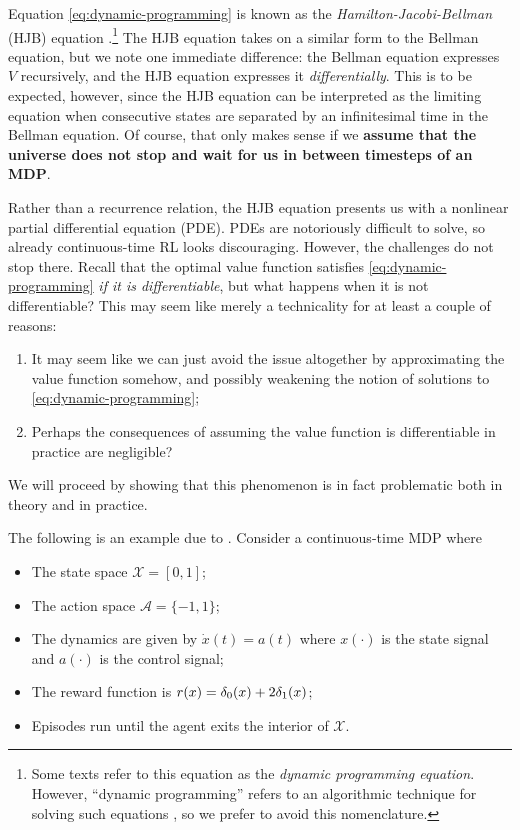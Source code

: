 Equation \eqref{eq:dynamic-programming} is known as the
\emph{Hamilton-Jacobi-Bellman} (HJB) equation
\citep{fleming2006controlled}.\footnote{Some texts refer to this
  equation as the \emph{dynamic programming equation}. However,
  ``dynamic programming'' refers to an algorithmic technique for
  solving such equations \citep{bellman1954theory}, so we prefer to
  avoid this nomenclature.} The HJB equation takes
on a similar form to the Bellman equation, but we note one immediate
difference: the Bellman equation expresses $V$ recursively, and the
HJB equation expresses it \emph{differentially}. This is to be expected, however, since the
HJB equation can be interpreted as the limiting equation when
consecutive states are separated by an infinitesimal time in the
Bellman equation. Of course, that only makes sense if we
\textbf{assume that the universe does not stop and wait for us in
  between timesteps of an MDP}.

Rather than a recurrence relation, the HJB equation presents us with a
nonlinear partial differential equation (PDE). PDEs are notoriously difficult to solve, so already
continuous-time RL looks discouraging. However, the challenges do not stop there. Recall that
the optimal value function satisfies \eqref{eq:dynamic-programming}
\emph{if it is differentiable}, but what happens when it is not
differentiable? This may seem like merely a technicality for at least
a couple of reasons:

\begin{enumerate}
\item It may seem like we can just avoid the issue altogether by
  approximating the value function somehow, and possibly weakening the
  notion of solutions to \eqref{eq:dynamic-programming};
\item Perhaps the consequences of assuming the value function is
  differentiable in practice are negligible?
\end{enumerate}

We will proceed by showing that this phenomenon is in fact problematic both in
theory and in practice.

The following is an example due to
\citet{Munos2004ASO}. Consider a continuous-time MDP where
\begin{itemize}
\item The state space $\mathcal{X} = [0,1]$;
\item The action space $\mathcal{A} = \{-1, 1\}$;
\item The dynamics are given by $\dot{x}(t) = a(t)$ where $x(\cdot)$
  is the state signal and $a(\cdot)$ is the control signal;
\item The reward function is $r(x) = \delta_{0}(x) + 2\delta_{1}(x)$;
\item Episodes run until the agent exits the interior of
  $\mathcal{X}$.
\end{itemize}

